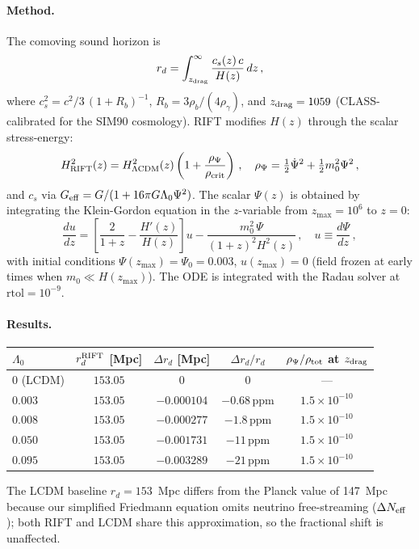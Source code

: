 \documentclass[12pt,a4paper]{article}
\begin{document}
\paragraph{Method.}
The comoving sound horizon is
\begin{equation}
r_d = \int_{z_{\rm drag}}^{\infty} \frac{c_s(z)\,c}{H(z)}\,dz\,,
\label{eq:rd_integral}
\end{equation}
where $c_s^2 = c^2/3\,(1+R_b)^{-1}$, $R_b = 3\rho_b/(4\rho_\gamma)$, and
$z_{\rm drag} = 1059$ (CLASS-calibrated for the SIM90 cosmology).
RIFT modifies $H(z)$ through the scalar stress-energy:
\begin{equation}
H_{\rm RIFT}^2(z) = H_{\Lambda{\rm CDM}}^2(z)\left(1 + \frac{\rho_\Psi}{\rho_{\rm crit}}\right)\,,
\quad
\rho_\Psi = \tfrac{1}{2}\dot\Psi^2 + \tfrac{1}{2}m_0^2\Psi^2\,,
\end{equation}
and $c_s$ via $G_{\rm eff} = G/(1+16\pi G\Lambda_0\Psi^2)$.
The scalar $\Psi(z)$ is obtained by integrating the Klein-Gordon equation
in the $z$-variable from $z_{\max}=10^6$ to $z=0$:
\begin{equation}
\frac{du}{dz} = \left[\frac{2}{1+z} - \frac{H'(z)}{H(z)}\right]u
               - \frac{m_0^2\,\Psi}{(1+z)^2 H^2(z)}\,,
\quad u \equiv \frac{d\Psi}{dz}\,,
\label{eq:KG_z}
\end{equation}
with initial conditions $\Psi(z_{\max}) = \Psi_0 = 0.003$,
$u(z_{\max}) = 0$ (field frozen at early times when $m_0 \ll H(z_{\max})$).
The ODE is integrated with the Radau solver at $\mathrm{rtol}=10^{-9}$.

\paragraph{Results.}
\begin{center}
\begin{tabular}{lcccc}
\toprule
$\Lambda_0$ & $r_d^{\rm RIFT}$ [Mpc] & $\Delta r_d$ [Mpc] & $\Delta r_d/r_d$ & $\rho_\Psi/\rho_{\rm tot}$ at $z_{\rm drag}$ \\
\midrule
$0$ (LCDM)  & $153.05$ & $0$ & $0$ & --- \\
$0.003$     & $153.05$ & $-0.000104$ & $-0.68\,\mathrm{ppm}$ & $1.5\times10^{-10}$ \\
$0.008$     & $153.05$ & $-0.000277$ & $-1.8\,\mathrm{ppm}$  & $1.5\times10^{-10}$ \\
$0.050$     & $153.05$ & $-0.001731$ & $-11\,\mathrm{ppm}$   & $1.5\times10^{-10}$ \\
$0.095$     & $153.05$ & $-0.003289$ & $-21\,\mathrm{ppm}$   & $1.5\times10^{-10}$ \\
\bottomrule
\end{tabular}
\end{center}
The LCDM baseline $r_d = 153$~Mpc differs from the Planck value of 147~Mpc
because our simplified Friedmann equation omits neutrino free-streaming
($\Delta N_{\rm eff}$); both RIFT and LCDM share this approximation,
so the fractional shift is unaffected.
\end{document}
